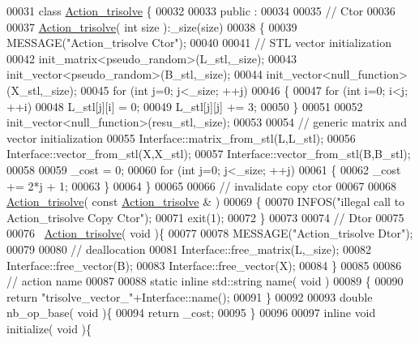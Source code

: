 \begin{DoxyCode}
00031 \textcolor{keyword}{class }\hyperlink{class_action__trisolve}{Action\_trisolve} \{
00032 
00033 public :
00034 
00035   \textcolor{comment}{// Ctor}
00036 
00037   \hyperlink{class_action__trisolve}{Action\_trisolve}( \textcolor{keywordtype}{int} size ):\_size(size)
00038   \{
00039     MESSAGE(\textcolor{stringliteral}{"Action\_trisolve Ctor"});
00040 
00041     \textcolor{comment}{// STL vector initialization}
00042     init\_matrix<pseudo\_random>(L\_stl,\_size);
00043     init\_vector<pseudo\_random>(B\_stl,\_size);
00044     init\_vector<null\_function>(X\_stl,\_size);
00045     \textcolor{keywordflow}{for} (\textcolor{keywordtype}{int} j=0; j<\_size; ++j)
00046     \{
00047       \textcolor{keywordflow}{for} (\textcolor{keywordtype}{int} i=0; i<j; ++i)
00048         L\_stl[j][i] = 0;
00049       L\_stl[j][j] += 3;
00050     \}
00051 
00052     init\_vector<null\_function>(resu\_stl,\_size);
00053 
00054     \textcolor{comment}{// generic matrix and vector initialization}
00055     Interface::matrix\_from\_stl(L,L\_stl);
00056     Interface::vector\_from\_stl(X,X\_stl);
00057     Interface::vector\_from\_stl(B,B\_stl);
00058 
00059     \_cost = 0;
00060     \textcolor{keywordflow}{for} (\textcolor{keywordtype}{int} j=0; j<\_size; ++j)
00061     \{
00062       \_cost += 2*j + 1;
00063     \}
00064   \}
00065 
00066   \textcolor{comment}{// invalidate copy ctor}
00067 
00068   \hyperlink{class_action__trisolve}{Action\_trisolve}( \textcolor{keyword}{const}  \hyperlink{class_action__trisolve}{Action\_trisolve} & )
00069   \{
00070     INFOS(\textcolor{stringliteral}{"illegal call to Action\_trisolve Copy Ctor"});
00071     exit(1);
00072   \}
00073 
00074   \textcolor{comment}{// Dtor}
00075 
00076   ~\hyperlink{class_action__trisolve}{Action\_trisolve}( \textcolor{keywordtype}{void} )\{
00077 
00078     MESSAGE(\textcolor{stringliteral}{"Action\_trisolve Dtor"});
00079 
00080     \textcolor{comment}{// deallocation}
00081     Interface::free\_matrix(L,\_size);
00082     Interface::free\_vector(B);
00083     Interface::free\_vector(X);
00084   \}
00085 
00086   \textcolor{comment}{// action name}
00087 
00088   \textcolor{keyword}{static} \textcolor{keyword}{inline} std::string name( \textcolor{keywordtype}{void} )
00089   \{
00090     \textcolor{keywordflow}{return} \textcolor{stringliteral}{"trisolve\_vector\_"}+Interface::name();
00091   \}
00092 
00093   \textcolor{keywordtype}{double} nb\_op\_base( \textcolor{keywordtype}{void} )\{
00094     \textcolor{keywordflow}{return} \_cost;
00095   \}
00096 
00097   \textcolor{keyword}{inline} \textcolor{keywordtype}{void} initialize( \textcolor{keywordtype}{void} )\{

\end{DoxyCode}

